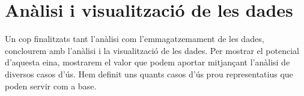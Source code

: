 \chapter{Anàlisi i visualització de les dades}\label{ch:log-analysis}

Un cop finalitzats tant l’anàlisi com l’emmagatzemament de les dades, conclourem amb l’anàlisi i la visualització de les dades.
Per mostrar el potencial d’aquesta eina, mostrarem el valor que podem aportar mitjançant l’anàlisi de diversos casos d’ús.
Hem definit uns quants casos d’ús prou representatius que poden servir com a base.

\noindent \\

\clearpage
